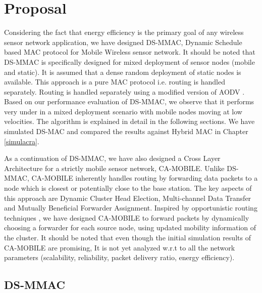 
\chapter{Proposal} %

\label{prop} %

Considering the fact that energy efficiency is the primary goal of any wireless sensor network application, we have designed DS-MMAC, Dynamic Schedule based MAC protocol for Mobile Wireless sensor network. It should be noted that DS-MMAC is specifically designed for mixed deployment of sensor nodes (mobile and static). It is assumed that a dense random deployment of static nodes is available. This approach is a pure MAC protocol i.e. routing is handled separately. Routing is handled separately using a modified version of AODV \cite{aodv}. Based on our performance evaluation of DS-MMAC, we observe that it performs very under in a mixed deployment scenario with mobile nodes moving at low velocities. The algorithm is explained in detail in the following sections. We have simulated DS-MAC and compared the results against Hybrid MAC \cite{hmac} in Chapter \ref{simulacra}. 

As a continuation of DS-MMAC, we have also designed a Cross Layer Architecture for a strictly mobile sensor network, CA-MOBILE. Unlike DS-MMAC, CA-MOBILE inherently handles routing by forwarding data packets to a node which is closest or potentially close to the base station. The key aspects of this approach are Dynamic Cluster Head Election, Multi-channel Data Transfer and Mutually Beneficial Forwarder Assignment. Inspired by opportunistic routing techniques \cite{exor}\cite{rof}, we have designed CA-MOBILE to forward packets by dynamically choosing a forwarder for each source node, using updated mobility information of the cluster. It should be noted that even though the initial simulation results of CA-MOBILE are promising, It is not yet analyzed w.r.t to all the network parameters (scalability, reliability, packet delivery ratio, energy efficiency). 

\section{DS-MMAC}


